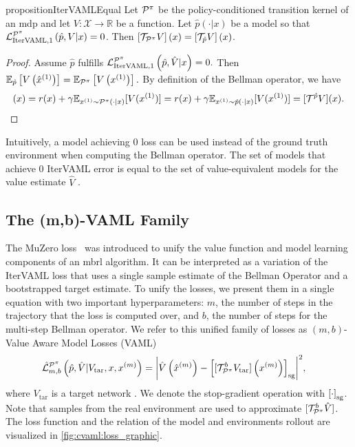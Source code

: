 \begin{restatable}{proposition}{IterVAMLEqual}{\textcite{itervaml}}\label{prop:cvaml:1_1}
    Let $\P^\pi$ be the policy-conditioned transition kernel of an \ac{mdp}   and let $V: \mathcal{X} \rightarrow \mathbb{R}$ be a function.
    Let $\hat{p}(\cdot|x)$ be a model so that ${\mathcal{L}}^{\P^\pi}_{\mathrm{IterVAML}, 1}\left(\hat{p},V|x\right) = 0$.
    Then $\squareb{\mathcal{T}_{\P^\pi} V }(x) = \squareb{\mathcal{T}_{\hat{p}} V }(x)$.
\end{restatable}
\begin{proof}
    Assume $\hat{p}$ fulfills ${\mathcal{L}}^{\P^\pi}_{\mathrm{IterVAML}, 1}\left(\hat{p},\hat{V}|x\right) = 0.$ Then $\mathbb{E}_{\hat{p}}\left[V\left(\hat{x}^{(1)}\right)\right] = \mathbb{E}_{\P^\pi}\left[V\left(x^{(1)}\right)\right].$ By definition of the Bellman operator, we have
    \begin{align}
        [\mathcal{T}^{\P^\pi} V](x) = r(x) + \gamma \mathbb{E}_{x^{(1)}\sim \P^\pi(\cdot|x)}[V(x^{(1)})] = r(x) + \gamma \mathbb{E}_{x^{(1)}\sim \hat{p}(\cdot|x)}[V(x^{(1)})] = [\mathcal{T}^{\hat{p}}V](x).\nonumber
    \end{align}
\end{proof}

Intuitively, a model achieving $0$ loss can be used instead of the ground truth environment when computing the Bellman operator.
The set of models that achieve $0$ IterVAML error is equal to the set of value-equivalent models for the value estimate $\hat{V}$ \parencite{grimm2021proper}.

\subsection{The (m,b)-VAML Family}
The MuZero loss~\parencite{schrittwieser2020mastering} was introduced to unify the value function and model learning components of an \ac{mbrl} algorithm.
It can be interpreted as a variation of the IterVAML loss that uses a single sample estimate of the Bellman Operator and a bootstrapped target estimate. 
To unify the losses, we present them in a single equation with two important hyperparameters: $m$, the number of steps in the trajectory that the loss is computed over, and $b$, the number of steps for the multi-step Bellman operator.
We refer to this unified family of losses as $(m,b)$-Value Aware Model Losses (VAML)
\begin{align}
    & \hat{\mathcal{L}}^{\P^\pi}_{m,b}\left(\hat{p},\hat{V}|V_\mathrm{tar},x, x^{(m)}\right) = \biggl|\hat{V}\roundb{\hat{x}^{(m)}} - 
    \squareb{[\mathcal{T}_{\P^\pi}^b V_\mathrm{tar}]\roundb{x^{(m)}}}_\mathrm{sg}\biggr|^2, \label{eq:cvaml:dal_loss}
\end{align}
where $V_\mathrm{tar}$ is a target network \parencite{dqn}.
We denote the stop-gradient operation with $\squareb{\cdot}_\mathrm{sg}$.
Note that samples from the real environment are used to approximate $[\mathcal{T}_{\P^\pi}^b \hat{V}]$.
The loss function and the relation of the model and environments rollout are visualized in \autoref{fig:cvaml:loss_graphic}.

